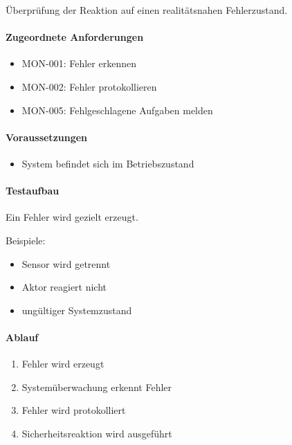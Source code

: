 \documentclass[
  a4paper,
  12pt,
  DIV=12,        %
  parskip=half,  %
  headings=small %
]{scrartcl}
\theoremstyle{definition}
\providecommand{\tightlist}{%
  \setlength{\itemsep}{0pt}\setlength{\parskip}{0pt}}
\theoremstyle{definition}
\begin{document}
Überprüfung der Reaktion auf einen realitätsnahen Fehlerzustand.

\paragraph{Zugeordnete
Anforderungen}\label{zugeordnete-anforderungen-31}

\begin{itemize}
\tightlist
\item
  MON-001: Fehler erkennen
\item
  MON-002: Fehler protokollieren
\item
  MON-005: Fehlgeschlagene Aufgaben melden
\end{itemize}

\paragraph{Voraussetzungen}\label{voraussetzungen-30}

\begin{itemize}
\tightlist
\item
  System befindet sich im Betriebszustand
\end{itemize}

\paragraph{Testaufbau}\label{testaufbau-7}

Ein Fehler wird gezielt erzeugt.

Beispiele:

\begin{itemize}
\tightlist
\item
  Sensor wird getrennt
\item
  Aktor reagiert nicht
\item
  ungültiger Systemzustand
\end{itemize}

\paragraph{Ablauf}\label{ablauf-31}

\begin{enumerate}
\def\labelenumi{\arabic{enumi}.}
\tightlist
\item
  Fehler wird erzeugt
\item
  Systemüberwachung erkennt Fehler
\item
  Fehler wird protokolliert
\item
  Sicherheitsreaktion wird ausgeführt
\end{enumerate}
\end{document}
